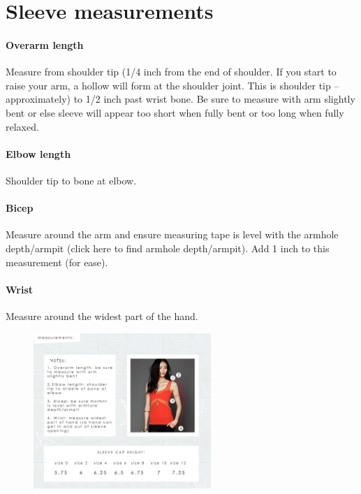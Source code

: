 \documentclass{article}
\begin{document}
\section{Sleeve measurements}

\paragraph{Overarm length}
Measure from shoulder tip (1/4 inch from the end of shoulder. If you start to raise your arm, a hollow will form at the shoulder joint. This is shoulder tip – approximately) to 1/2 inch past wrist bone. Be sure to measure with arm slightly bent or else sleeve will appear too short when fully bent or too long when fully relaxed.

\paragraph{Elbow length}
Shoulder tip to bone at elbow.

\paragraph{Bicep}
Measure around the arm and ensure measuring tape is level with the armhole depth/armpit (click here to find armhole depth/armpit). Add 1 inch to this measurement (for ease).

\paragraph{Wrist}
Measure around the widest part of the hand.


\begin{figure}[!htp]
\centering
	\includegraphics[width=0.6\textwidth]{slv-measurements.jpg}
\end{figure}
\end{document}
